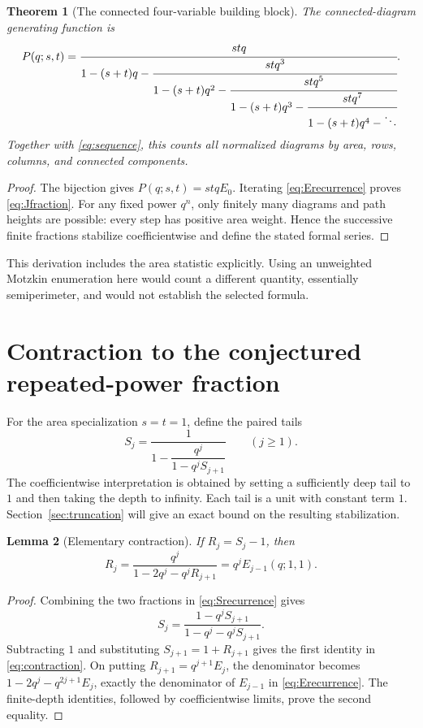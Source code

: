 \documentclass[11pt,letterpaper]{article}
\numberwithin{equation}{section}
\newtheorem{theorem}{Theorem}[section]
\newtheorem{lemma}[theorem]{Lemma}
\theoremstyle{definition}
\begin{document}
\begin{theorem}[The connected four-variable building block]
\label{thm:Jfraction}
The connected-diagram generating function is
\begin{equation}
 P(q;s,t)=\cfrac{stq}{1-(s+t)q-
 \cfrac{stq^3}{1-(s+t)q^2-
 \cfrac{stq^5}{1-(s+t)q^3-
 \cfrac{stq^7}{1-(s+t)q^4-\ddots}}}}.
 \label{eq:Jfraction}
\end{equation}
Together with \eqref{eq:sequence}, this counts all normalized diagrams by
area, rows, columns, and connected components.
\end{theorem}
\begin{proof}
The bijection gives $P(q;s,t)=stqE_0$. Iterating
\eqref{eq:Erecurrence} proves \eqref{eq:Jfraction}. For any fixed power
$q^n$, only finitely many diagrams and path heights are possible: every
step has positive area weight. Hence the successive finite fractions
stabilize coefficientwise and define the stated formal series.
\end{proof}

This derivation includes the area statistic explicitly. Using an unweighted
Motzkin enumeration here would count a different quantity, essentially
semiperimeter, and would not establish the selected formula.

\section{Contraction to the conjectured repeated-power fraction}
\label{sec:contraction}

For the area specialization $s=t=1$, define the paired tails
\begin{equation}
 S_j=\frac{1}{1-\dfrac{q^j}{1-q^jS_{j+1}}}\qquad(j\ge1).
 \label{eq:Srecurrence}
\end{equation}
The coefficientwise interpretation is obtained by setting a sufficiently
deep tail to $1$ and then taking the depth to infinity. Each tail is a
unit with constant term $1$. Section~\ref{sec:truncation} will give an exact
bound on the resulting stabilization.

\begin{lemma}[Elementary contraction]
\label{lem:contraction}
If $R_j=S_j-1$, then
\begin{equation}
 R_j=\frac{q^j}{1-2q^j-q^jR_{j+1}}=q^jE_{j-1}(q;1,1).
 \label{eq:contraction}
\end{equation}
\end{lemma}
\begin{proof}
Combining the two fractions in \eqref{eq:Srecurrence} gives
\[
 S_j=\frac{1-q^jS_{j+1}}{1-q^j-q^jS_{j+1}}.
\]
Subtracting $1$ and substituting $S_{j+1}=1+R_{j+1}$ gives the first
identity in \eqref{eq:contraction}. On putting
$R_{j+1}=q^{j+1}E_j$, the denominator becomes
$1-2q^j-q^{2j+1}E_j$, exactly the denominator of
$E_{j-1}$ in \eqref{eq:Erecurrence}. The finite-depth identities, followed
by coefficientwise limits, prove the second equality.
\end{proof}
\end{document}
